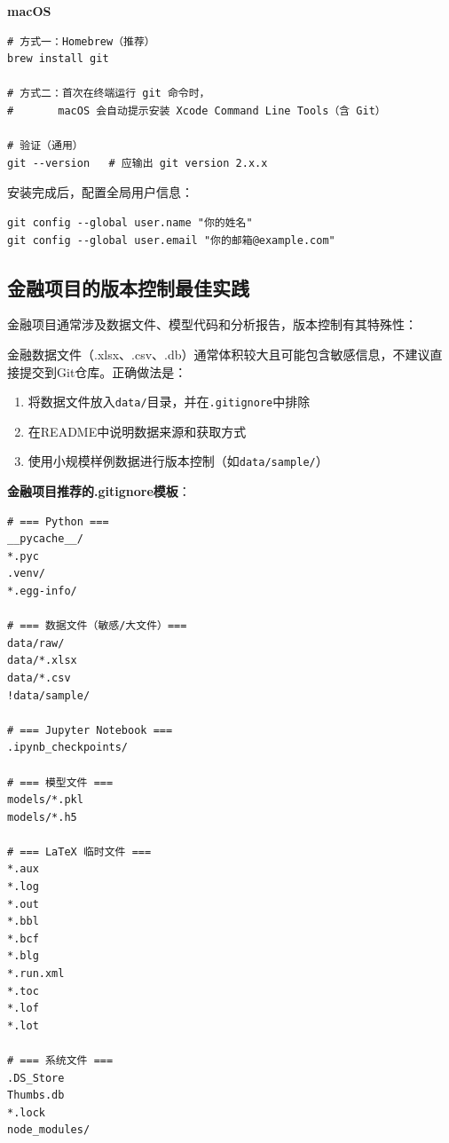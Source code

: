 \textbf{macOS}

\begin{lstlisting}[style=shell]
# 方式一：Homebrew（推荐）
brew install git

# 方式二：首次在终端运行 git 命令时，
#       macOS 会自动提示安装 Xcode Command Line Tools（含 Git）

# 验证（通用）
git --version   # 应输出 git version 2.x.x
\end{lstlisting}

安装完成后，配置全局用户信息：

\begin{lstlisting}[style=shell]
git config --global user.name "你的姓名"
git config --global user.email "你的邮箱@example.com"
\end{lstlisting}

\subsection{金融项目的版本控制最佳实践}

金融项目通常涉及数据文件、模型代码和分析报告，版本控制有其特殊性：

\begin{warningbox}[数据文件不要纳入Git管理]
金融数据文件（.xlsx、.csv、.db）通常体积较大且可能包含敏感信息，不建议直接提交到Git仓库。正确做法是：
\begin{enumerate}[leftmargin=2em]
  \item 将数据文件放入\texttt{data/}目录，并在\texttt{.gitignore}中排除
  \item 在README中说明数据来源和获取方式
  \item 使用小规模样例数据进行版本控制（如\texttt{data/sample/}）
\end{enumerate}
\end{warningbox}

\textbf{金融项目推荐的.gitignore模板}：

\begin{lstlisting}
# === Python ===
__pycache__/
*.pyc
.venv/
*.egg-info/

# === 数据文件（敏感/大文件）===
data/raw/
data/*.xlsx
data/*.csv
!data/sample/

# === Jupyter Notebook ===
.ipynb_checkpoints/

# === 模型文件 ===
models/*.pkl
models/*.h5

# === LaTeX 临时文件 ===
*.aux
*.log
*.out
*.bbl
*.bcf
*.blg
*.run.xml
*.toc
*.lof
*.lot

# === 系统文件 ===
.DS_Store
Thumbs.db
*.lock
node_modules/
\end{lstlisting}

